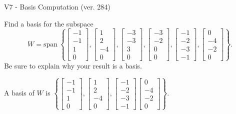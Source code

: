 \begin{exercise}
  \begin{exerciseTitle}V7 - Basis Computation (ver. 284)\end{exerciseTitle}
  \begin{exerciseStatement}
    Find a basis for the subspace 
\[W=\mathrm{span}\ \left\{\left[\begin{array}{r}
-1 \\
-1 \\
1 \\
0
\end{array}\right] , \left[\begin{array}{r}
1 \\
2 \\
-4 \\
0
\end{array}\right] , \left[\begin{array}{r}
-3 \\
-3 \\
3 \\
0
\end{array}\right] , \left[\begin{array}{r}
-3 \\
-2 \\
0 \\
0
\end{array}\right] , \left[\begin{array}{r}
-1 \\
-2 \\
-3 \\
-1
\end{array}\right] , \left[\begin{array}{r}
0 \\
-4 \\
-2 \\
0
\end{array}\right]\right\}.\]
 Be sure to explain why your result is a basis.


  \end{exerciseStatement}
  \begin{exerciseAnswer}
   A basis of \(W\) is  \(\left\{\left[\begin{array}{r}
-1 \\
-1 \\
1 \\
0
\end{array}\right] , \left[\begin{array}{r}
1 \\
2 \\
-4 \\
0
\end{array}\right] , \left[\begin{array}{r}
-1 \\
-2 \\
-3 \\
-1
\end{array}\right] \left[\begin{array}{r}
0 \\
-4 \\
-2 \\
0
\end{array}\right]\right\}\).
  


  \end{exerciseAnswer}
\end{exercise}